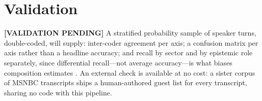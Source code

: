 \documentclass[12pt, letterpaper]{article}
\begin{document}
\section{Validation}\label{si_validation}

\textbf{[VALIDATION PENDING]} A stratified probability sample of speaker turns,
double-coded, will supply: inter-coder agreement per axis; a confusion matrix
per axis rather than a headline accuracy; and recall by sector and by epistemic
role separately, since differential recall---not average accuracy---is what
biases composition estimates \citep{asr2021}. An external check is available at
no cost: a sister corpus of MSNBC transcripts ships a human-authored guest list
for every transcript, sharing no code with this pipeline.
\end{document}
